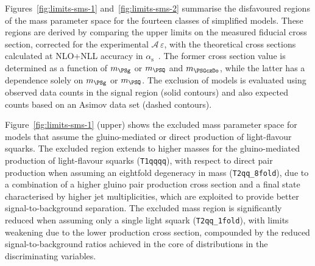 Figures~\ref{fig:limits-sms-1} and~\ref{fig:limits-sms-2} summarise
the disfavoured regions of the mass parameter space for the fourteen
classes of simplified models. These regions are derived by comparing
the upper limits on the measured fiducial cross section, corrected for
the experimental $\mathcal{A}\,\varepsilon$, with the theoretical cross
sections calculated at NLO+NLL accuracy in
$\alpha_\mathrm{s}$~\cite{susynlo}. The former cross section value is
determined as a function of $m_{\PSg}$ or $m_{\PSQ}$ and
$m_{\PSGczDo}$, while the latter has a dependence solely on $m_{\PSg}$
or $m_{\PSQ}$.
The exclusion of models is evaluated using observed data counts in the
signal region (solid contours) and also expected counts based on an
Asimov data set (dashed contours).

Figure~\ref{fig:limits-sms-1} (upper) shows the excluded mass parameter
space for models that assume the gluino-mediated or direct production
of light-flavour squarks. The excluded region extends to higher masses
for the gluino-mediated production of light-flavour squarks
(\texttt{T1qqqq}), with respect to direct pair production when
assuming an eightfold degeneracy in mass (\texttt{T2qq\_8fold}), due
to a combination of a higher gluino pair production cross section and
a final state characterised by higher jet multiplicities, which are
exploited to provide better signal-to-background separation. The
excluded mass region is significantly reduced when assuming only a
single light squark (\texttt{T2qq\_1fold}), with limits weakening due
to the lower production cross section, compounded by the reduced
signal-to-background ratios achieved in the core of distributions in
the discriminating variables.

